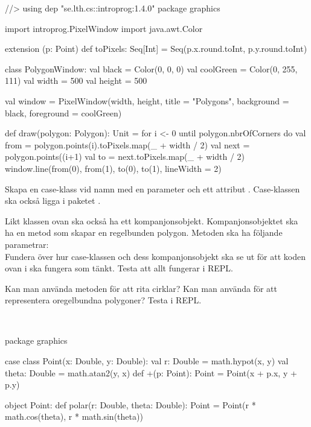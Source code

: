 \begin{Code}
//> using dep "se.lth.cs::introprog:1.4.0"
package graphics

import introprog.PixelWindow
import java.awt.Color

extension (p: Point) def toPixels: Seq[Int] = 
  Seq(p.x.round.toInt, p.y.round.toInt)

class PolygonWindow:
  val black     = Color(0, 0, 0)
  val coolGreen = Color(0, 255, 111)
  val width     = 500
  val height    = 500

  val window = 
    PixelWindow(width, height, title = "Polygons", 
                background = black, foreground = coolGreen)

  def draw(polygon: Polygon): Unit =
    for i <- 0 until polygon.nbrOfCorners do
      val from = polygon.points(i).toPixels.map(_ + width / 2)
      val next = polygon.points((i+1) %
      val to = next.toPixels.map(_ + width / 2)
      window.line(from(0), from(1), to(0), to(1), lineWidth = 2)
\end{Code}

Skapa en case-klass vid namn  med en parameter  och ett attribut . Case-klassen  ska också ligga i paketet . 

Likt klassen  ovan ska också  ha ett kompanjonsobjekt. 
Kompanjonsobjektet ska ha en metod  som skapar en regelbunden polygon. Metoden ska ha följande parametrar: \\
Fundera över hur case-klassen  och dess kompanjonsobjekt ska se ut för att koden ovan i  ska fungera som tänkt. Testa att allt fungerar i REPL.

\Subtask Kan man använda metoden  för att rita cirklar? Kan man använda  för att representera oregelbundna polygoner?
Testa i REPL.

\SOLUTION

\TaskSolved \what~

\Subtask \begin{Code}
package graphics

case class Point(x: Double, y: Double):
  val r: Double = math.hypot(x, y)
  val theta: Double = math.atan2(y, x)
  def +(p: Point): Point = Point(x + p.x, y + p.y)

object Point:
  def polar(r: Double, theta: Double): Point =
    Point(r * math.cos(theta), r * math.sin(theta))
\end{Code}

